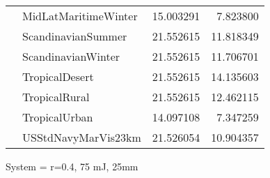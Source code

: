 \begin{tabular}{llrr}
             & MidLatMaritimeWinter &  15.003291 &   7.823800 \\
             & ScandinavianSummer &  21.552615 &  11.818349 \\
             & ScandinavianWinter &  21.552615 &  11.706701 \\
             & TropicalDesert &  21.552615 &  14.135603 \\
             & TropicalRural &  21.552615 &  12.462115 \\
             & TropicalUrban &  14.097108 &   7.347259 \\
             & USStdNavyMarVis23km &  21.526054 &  10.904357 \\
\bottomrule
\end{tabular}


\clearpage
System = r=0.4, 75 mJ, 25mm

